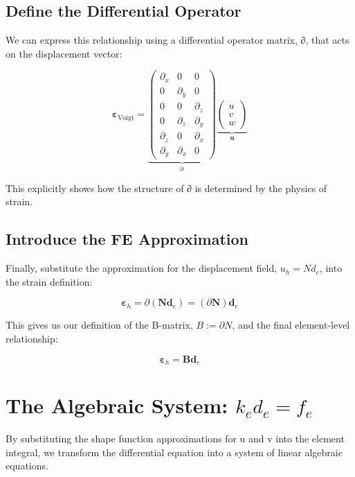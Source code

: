 \documentclass[
  11pt,
  a4paper,
]{scrbook}
\begin{document}
\subsection{Define the Differential
Operator}\label{define-the-differential-operator}

We can express this relationship using a differential operator matrix,
∂, that acts on the displacement vector:

\[\boldsymbol{\varepsilon}_{\text{Voigt}} = \underbrace{ \begin{pmatrix} \partial_x & 0 & 0 \\ 0 & \partial_y & 0 \\ 0 & 0 & \partial_z \\ 0 & \partial_z & \partial_y \\ \partial_z & 0 & \partial_x \\ \partial_y & \partial_x & 0 \end{pmatrix} }_{\partial} \underbrace{ \begin{pmatrix} u \\ v \\ w \end{pmatrix} }_{\mathbf{u}}\]

This explicitly shows how the structure of ∂ is determined by the
physics of strain.

\subsection{Introduce the FE
Approximation}\label{introduce-the-fe-approximation}

Finally, substitute the approximation for the displacement field,
\(u_h=Nd_e\), into the strain definition:

\[\boldsymbol{\varepsilon}_h = \partial (\mathbf{N}\mathbf{d}_e) = (\partial\mathbf{N})\mathbf{d}_e\]

This gives us our definition of the B-matrix, \(B:=\partial N\), and the
final element-level relationship:

\[\boldsymbol{\varepsilon}_h = \mathbf{B}\mathbf{d}_e\]

\section{\texorpdfstring{The Algebraic System:
\(k_e d_e = f_e\)}{The Algebraic System: k\_e d\_e = f\_e}}\label{the-algebraic-system-k_e-d_e-f_e}

By substituting the shape function approximations for u and v into the
element integral, we transform the differential equation into a system
of linear algebraic equations.
\end{document}
